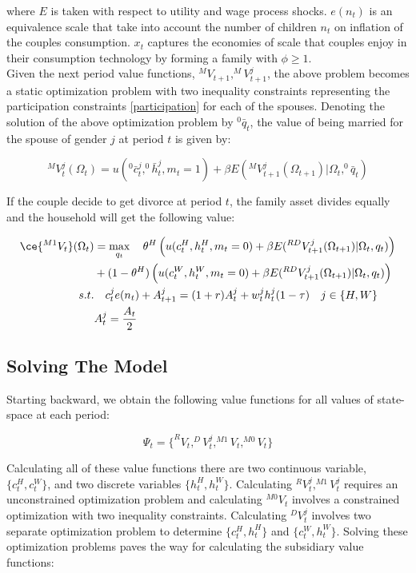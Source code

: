 where $E$ is taken with respect to utility and wage process shocks.  $e(n_t)$ is an equivalence scale that take into account the number of children $n_t$ on inflation of the couples consumption. $x_t$ captures the economies of scale that couples enjoy in their consumption technology by forming a family with $\phi \geq 1$.  \\

Given the next period value functions, $^MV_{t+1}, ^MV^j_{t+1}$, the above problem becomes a static optimization problem with two inequality constraints representing the participation constraints \eqref{participation} for each of the spouses. Denoting the solution of the above optimization problem by $^0 \bar q_t$, the value of being married for the spouse of gender $j$ at period $t$ is given by:

\begin{equation*}
^{M}V_t^j (\Omega_t) = u(^0 \bar c_t^j, ^0 \bar h_t^j, m_t = 1) + \beta E \left (^MV^j_{t+1}(\Omega_{t+1}) | \Omega_t, ^{0} \bar q_t \right ) 
\end{equation*}

If the couple decide to get divorce at period $t$, the family asset divides equally and the household will get the following value:

\begin{align*}
\ce{^{M1}V_t}(\Omega_t)  &= \max_{q_t} \quad  \theta^H \left ( u(c_t^H, h_t^H, m_t =0)  + \beta E(^{RD}V^j_{t+1} (\Omega_{t+1})| \Omega_t, q_t) \right) \\
  & + (1 - \theta^H) \left ( u(c_t^W, h_t^W, m_t = 0) + \beta E(^{RD}V^j_{t+1} (\Omega_{t+1})| \Omega_t, q_t) \right )\\
s.t. & \quad   c_t^j e(n_t) + A_{t+1}^j = (1+r) A_t^j + w_t^j h_t^j (1 - \tau) \quad j \in \{H, W\} \\
& A_t ^j = \dfrac{A_t}{2}
\end{align*}
 
\subsection{Solving The Model}

Starting backward, we obtain the following value functions for all values of state-space at each period:

\begin{equation*}
\Psi_t =\{ ^{R}V_t, ^DV^j_t, ^{M1}V_t, ^{M0}V_t\}
\end{equation*}

\noindent Calculating all of these value functions there are two continuous variable, $\{c_t^H, c_t^W\}$, and two discrete variables $\{h_t^H, h_t^W\}$. Calculating $^RV_t^j, ^{M1}V_t^j$ requires an unconstrained optimization problem and  calculating $^{M0}V_t$ involves a constrained optimization with two inequality constraints. Calculating $^DV_t^j$ involves two separate optimization problem to determine $\{c_t^H, h_t^H\}$ and $\{c_t^W, h_t^W\}$.  Solving these optimization problems paves the way for calculating the subsidiary value functions:

